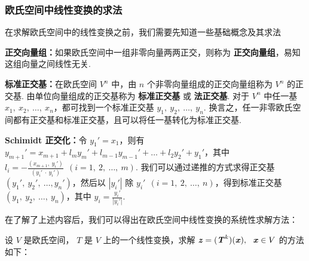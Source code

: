         \subsubsection{欧氏空间中线性变换的求法}
            \par 在求解欧氏空间中的线性变换之前，我们需要先知道一些基础概念及其求法
            \par \textbf{正交向量组：}如果欧氏空间中一组非零向量两两正交，则称为 \textbf{正交向量组}，易知这组向量之间线性无关.
            \par \textbf{标准正交基：}在欧氏空间 $V^n$ 中，由 $n$ 个非零向量组成的正交向量组称为 $V^n$ 的正交基. 由单位向量组成的正交基称为 \textbf{标准正交基} 或 \textbf{法正交基}. 对于 $V^n$ 中任一基$x_1, \ x_2, \ \dots, \ x_n$，都可找到一个标准正交基 $y_1, \ y_2, \ \dots, \ y_n$. 换言之，任一非零欧氏空间都有正交基和标准正交基，且可以将任一基转化为标准正交基.
            \par \textbf{Schimidt 正交化：}令 $y_1' = x_1$，则有 $y_{m+1}' = x_{m+1} + l_my_m' + l_{m-1}y_{m-1}' + \dots + l_2y_2' + y_1'$，其中 $l_i = -\frac{(x_{m+1}, \ y_i')}{(y_i' \ \cdot \ y_i')} \ \ (i = 1, \ 2, \ \dots, \ m)$. 我们可以通过递推的方式求得正交基 $(y_1', \ y_2', \ \dots, y_n')$，然后以 $|y_i'|$ 除 $y_i' \ \ (i = 1, \ 2, \ \dots, \ n)$，得到标准正交基 $(y_1, \ y_2, \ \dots, \ y_n)$，其中 $y_i = \frac{y_i'}{|y_i'|}$.
            \\
            \par 在了解了上述内容后，我们可以得出在欧氏空间中线性变换的系统性求解方法：
            \par 设 $V$ 是欧氏空间， $T$ 是 $V$ 上的一个线性变换，求解 $\textbf{\textit{z}} = (\textbf{\textit{T}}^k)(\textbf{\textit{x}}), \ \ \textbf{\textit{x}} \in V$ 的方法如下：
